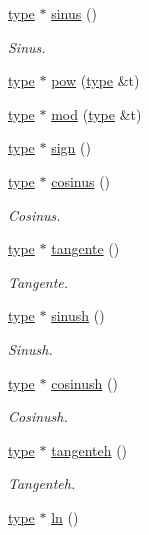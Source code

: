 \begin{DoxyCompactItemize}
\hyperlink{classtype}{type} $\ast$ \hyperlink{class_expression_a70133c8c9911b1193eb8fff99c3c8693}{sinus} ()
\begin{DoxyCompactList}\small\item\em Sinus. \end{DoxyCompactList}\item 
\hyperlink{classtype}{type} $\ast$ \hyperlink{class_expression_a9b7133faeacde4cf9c297275cc07a119}{pow} (\hyperlink{classtype}{type} \&t)
\item 
\hyperlink{classtype}{type} $\ast$ \hyperlink{class_expression_a4c590a64e8cb76efddca70e3de240640}{mod} (\hyperlink{classtype}{type} \&t)
\item 
\hyperlink{classtype}{type} $\ast$ \hyperlink{class_expression_a62923fe874212a2d52d8a14769e774a1}{sign} ()
\item 
\hyperlink{classtype}{type} $\ast$ \hyperlink{class_expression_a39bd1c7e48333e054d7bb73a445bbcad}{cosinus} ()
\begin{DoxyCompactList}\small\item\em Cosinus. \end{DoxyCompactList}\item 
\hyperlink{classtype}{type} $\ast$ \hyperlink{class_expression_ad991242120a3cd6da6f76b4a42a8a992}{tangente} ()
\begin{DoxyCompactList}\small\item\em Tangente. \end{DoxyCompactList}\item 
\hyperlink{classtype}{type} $\ast$ \hyperlink{class_expression_a034e6da5d4074ddd9e042b19d2ec027c}{sinush} ()
\begin{DoxyCompactList}\small\item\em Sinush. \end{DoxyCompactList}\item 
\hyperlink{classtype}{type} $\ast$ \hyperlink{class_expression_ad253a0ab9264d8d0f5eda102bc4fce65}{cosinush} ()
\begin{DoxyCompactList}\small\item\em Cosinush. \end{DoxyCompactList}\item 
\hyperlink{classtype}{type} $\ast$ \hyperlink{class_expression_a61f68d2937cef47108ca36ffdc451b77}{tangenteh} ()
\begin{DoxyCompactList}\small\item\em Tangenteh. \end{DoxyCompactList}\item 
\hyperlink{classtype}{type} $\ast$ \hyperlink{class_expression_a3590b5a1c78a0bd0d7783dc101151fe4}{ln} ()

\end{DoxyCompactItemize}
